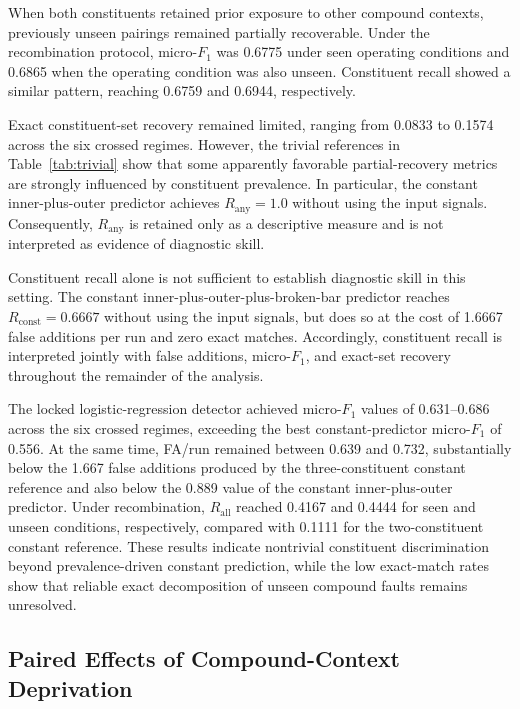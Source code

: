 When both constituents retained prior exposure to other compound contexts,
previously unseen pairings remained partially recoverable. Under the
recombination protocol, micro-$F_1$ was 0.6775 under seen operating
conditions and 0.6865 when the operating condition was also unseen.
Constituent recall showed a similar pattern, reaching 0.6759 and 0.6944,
respectively.

Exact constituent-set recovery remained limited, ranging from 0.0833 to
0.1574 across the six crossed regimes. However, the trivial references in
Table~\ref{tab:trivial} show that some apparently favorable
partial-recovery metrics are strongly influenced by constituent prevalence.
In particular, the constant inner-plus-outer predictor achieves
$R_{\mathrm{any}} = 1.0$ without using the input signals. Consequently,
$R_{\mathrm{any}}$ is retained only as a descriptive measure and is not
interpreted as evidence of diagnostic skill.

Constituent recall alone is not sufficient to establish diagnostic skill in
this setting. The constant inner-plus-outer-plus-broken-bar predictor
reaches $R_{\mathrm{const}} = 0.6667$ without using the input signals, but
does so at the cost of 1.6667 false additions per run and zero exact
matches. Accordingly, constituent recall is interpreted jointly with false
additions, micro-$F_1$, and exact-set recovery throughout the remainder of
the analysis.

The locked logistic-regression detector achieved micro-$F_1$ values of
0.631--0.686 across the six crossed regimes, exceeding the best
constant-predictor micro-$F_1$ of 0.556. At the same time, FA/run remained
between 0.639 and 0.732, substantially below the 1.667 false additions
produced by the three-constituent constant reference and also below the
0.889 value of the constant inner-plus-outer predictor. Under
recombination, $R_{\mathrm{all}}$ reached 0.4167 and 0.4444 for seen and
unseen conditions, respectively, compared with 0.1111 for the
two-constituent constant reference. These results indicate nontrivial
constituent discrimination beyond prevalence-driven constant prediction,
while the low exact-match rates show that reliable exact decomposition of
unseen compound faults remains unresolved.

\subsection{Paired Effects of Compound-Context Deprivation}
\label{sec:pairedeffects}


